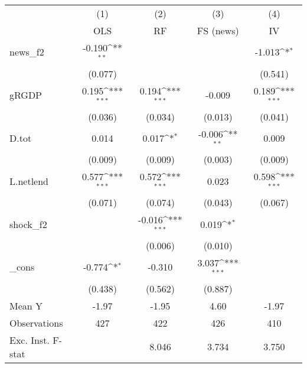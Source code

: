 {
\def\sym#1{\ifmmode^{#1}\else\(^{#1}\)\fi}
\begin{tabular}{l*{4}{c}}
\toprule
            &\multicolumn{1}{c}{(1)}&\multicolumn{1}{c}{(2)}&\multicolumn{1}{c}{(3)}&\multicolumn{1}{c}{(4)}\\
            &\multicolumn{1}{c}{OLS}&\multicolumn{1}{c}{RF}&\multicolumn{1}{c}{FS (news)}&\multicolumn{1}{c}{IV}\\
\midrule
news\_f2     &      -0.190\sym{**} &                     &                     &      -1.013\sym{*}  \\
            &     (0.077)         &                     &                     &     (0.541)         \\
\addlinespace
gRGDP       &       0.195\sym{***}&       0.194\sym{***}&      -0.009         &       0.189\sym{***}\\
            &     (0.036)         &     (0.034)         &     (0.013)         &     (0.041)         \\
\addlinespace
D.tot       &       0.014         &       0.017\sym{*}  &      -0.006\sym{**} &       0.009         \\
            &     (0.009)         &     (0.009)         &     (0.003)         &     (0.009)         \\
\addlinespace
L.netlend   &       0.577\sym{***}&       0.572\sym{***}&       0.023         &       0.598\sym{***}\\
            &     (0.071)         &     (0.074)         &     (0.043)         &     (0.067)         \\
\addlinespace
shock\_f2    &                     &      -0.016\sym{***}&       0.019\sym{*}  &                     \\
            &                     &     (0.006)         &     (0.010)         &                     \\
\addlinespace
\_cons      &      -0.774\sym{*}  &      -0.310         &       3.037\sym{***}&                     \\
            &     (0.438)         &     (0.562)         &     (0.887)         &                     \\
\midrule
Mean Y      &       -1.97         &       -1.95         &        4.60         &       -1.97         \\
Observations&         427         &         422         &         426         &         410         \\
Exc. Inst. F-stat&                     &       8.046         &       3.734         &       3.750         \\
\bottomrule
\end{tabular}
}
